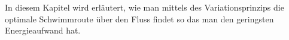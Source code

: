 \begin{refsection}
In diesem Kapitel wird erläutert, wie man mittels des Variationsprinzips die optimale Schwimmroute über den Fluss findet so das man den geringsten Energieaufwand hat.










% 


%



















\end{refsection}
